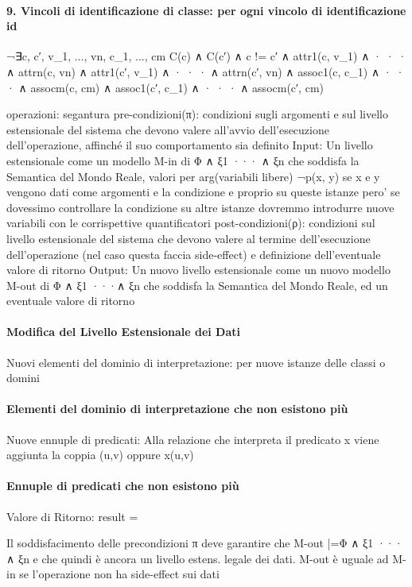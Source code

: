 \documentclass[12pt]{article}
\begin{document}
\paragraph{9. Vincoli di identificazione di classe: per ogni vincolo di identificazione {id}}
¬∃c, c′, v_1, ..., vn, c_1, ..., cm C(c) ∧ C(c′) ∧ c != c′ ∧ attr1(c, v_1) ∧ · · · ∧ attrn(c, vn) ∧ attr1(c′, v_1) ∧ · · · ∧ attrn(c′, vn) ∧ assoc1(c, c_1) ∧ · · · ∧ assocm(c, cm) ∧ assoc1(c′, c_1) ∧ · · · ∧ assocm(c′, cm)

operazioni: segantura
	pre-condizioni(π): condizioni sugli argomenti e sul livello estensionale del sistema che devono valere all’avvio dell’esecuzione dell’operazione, affinché il suo comportamento sia definito
		Input: Un livello estensionale come un modello M-in di Φ ∧ ξ1 ··· ∧ ξn che soddisfa la Semantica del Mondo Reale, valori per arg(variabili libere)
		¬p(x, y) se x e y vengono dati come argomenti e la condizione e proprio su queste istanze pero' se dovessimo controllare la condizione su altre istanze dovremmo introdurre nuove variabili con le corrispettive quantificatori
	post-condizioni(ρ): condizioni sul livello estensionale del sistema che devono valere al termine dell’esecuzione dell’operazione (nel caso questa faccia side-effect) e definizione dell’eventuale valore di ritorno
		Output: Un nuovo livello estensionale come un nuovo modello M-out di Φ ∧ ξ1 ···∧ ξn che soddisfa la Semantica del Mondo Reale, ed un eventuale valore di ritorno
\paragraph{Modifica del Livello Estensionale dei Dati}
			Nuovi elementi del dominio di interpretazione: per nuove istanze delle classi o domini
\paragraph{Elementi del dominio di interpretazione che non esistono più}
			Nuove ennuple di predicati: Alla relazione che interpreta il predicato x viene aggiunta la coppia (u,v) oppure x(u,v)
\paragraph{Ennuple di predicati che non esistono più}
			Valore di Ritorno: result = 

Il soddisfacimento delle precondizioni π deve garantire che M-out |=Φ ∧ ξ1 ··· ∧ ξn e che quindi è ancora un livello estens. legale dei dati.
M-out è uguale ad M-in se l’operazione non ha side-effect sui dati
\end{document}
